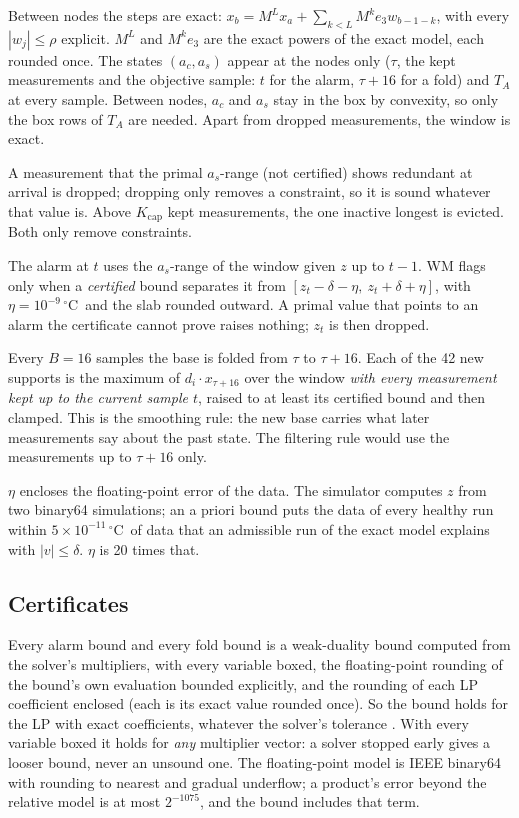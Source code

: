 \documentclass[11pt,a4paper]{article}
\newcommand{\degC}{\ensuremath{{}^\circ}C}
\newcommand{\sci}[2]{\ensuremath{#1\times10^{#2}}}
\begin{document}
Between nodes the steps are exact:
$x_b = M^L x_a + \sum_{k<L} M^k e_3 w_{b-1-k}$, with every $|w_j|\le\rho$ explicit. $M^L$ and $M^k e_3$ are the exact
powers of the exact model, each rounded once. The states $(a_c, a_s)$ appear at the nodes only ($\tau$, the kept
measurements and the objective sample: $t$ for the alarm, $\tau+16$ for a fold) and $T_A$ at every sample. Between nodes, $a_c$ and $a_s$ stay in the
box by convexity, so only the box rows of $T_A$ are needed. Apart from dropped measurements, the window is exact.

A measurement that the primal $a_s$-range (not
certified) shows redundant at arrival is dropped; dropping only removes a constraint, so it is sound whatever that value
is. Above $K_{\mathrm{cap}}$ kept measurements, the one inactive longest is
evicted. Both only remove constraints.

The alarm at $t$ uses the $a_s$-range of the window given $z$ up to $t-1$. WM flags only when a \emph{certified} bound
separates it from $[z_t-\delta-\eta,\ z_t+\delta+\eta]$, with $\eta = 10^{-9}$\,\degC\ and the slab rounded outward. A
primal value that points to an alarm the certificate cannot prove raises nothing; $z_t$ is then dropped.

Every $B = 16$ samples the base is folded from $\tau$ to $\tau+16$. Each of the 42 new supports is the maximum of
$d_i\cdot x_{\tau+16}$ over the window \emph{with every measurement kept up to the current
sample $t$}, raised to at least
its certified bound and then clamped. This is the smoothing rule: the new base carries what later measurements say
about the past state. The filtering rule would use the measurements up to $\tau+16$ only.

$\eta$ encloses the floating-point error of the data. The simulator computes $z$ from two binary64 simulations; an a
priori bound puts the data of every healthy run within \sci{5}{-11}\,\degC\ of data that an admissible run of the exact
model explains with $|v|\le\delta$. $\eta$ is 20 times that.

\subsection{Certificates}\label{sec:cert}

Every alarm bound and every fold bound is a weak-duality bound computed from the solver's multipliers, with every
variable boxed, the floating-point rounding of the bound's own evaluation bounded explicitly, and the rounding of each
LP coefficient enclosed (each is its exact value rounded once). So the bound holds for the LP with exact coefficients,
whatever the solver's tolerance \citep{neumaier2004,jansson2004}. With every variable boxed it holds for \emph{any}
multiplier vector: a solver stopped early gives a looser bound, never an unsound one. The floating-point model is IEEE
binary64 with rounding to nearest and gradual underflow; a product's error beyond the relative model is at most
$2^{-1075}$, and the bound includes that term.
\end{document}
